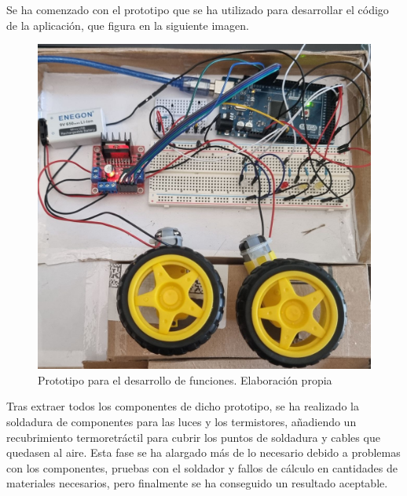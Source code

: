  Se ha comenzado con el prototipo que se ha utilizado para desarrollar el código de la aplicación, que figura en la siguiente imagen.

\begin{figure}[H]
    \centering
    \includegraphics[width=1\textwidth]{imagenes/montaje/prototipo.jpg}
    \caption{Prototipo para el desarrollo de funciones. Elaboración propia}
\end{figure}

 Tras extraer todos los componentes de dicho prototipo, se ha realizado la soldadura de componentes para las luces y los termistores, añadiendo un recubrimiento termoretráctil para cubrir los puntos de soldadura y cables que quedasen al aire. Esta fase se ha alargado más de lo necesario debido a problemas con los componentes, pruebas con el soldador y fallos de cálculo en cantidades de materiales necesarios, pero finalmente se ha conseguido un resultado aceptable. 

